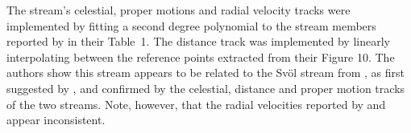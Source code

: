The stream's celestial, proper motions and radial velocity tracks were implemented by fitting a second degree polynomial to the stream members reported by \citet{Yang2023} in their Table~1. The distance track was implemented by linearly interpolating between the reference points extracted from their Figure 10. The authors show this stream appears to be related to the Sv\"ol stream from \citet{Ibata2021}, as first suggested by \citet{Bonaca2021}, and confirmed by the celestial, distance and proper motion tracks of the two streams. Note, however, that the radial velocities reported by \citet{Yang2023} and \citet{Ibata2021} appear inconsistent.
